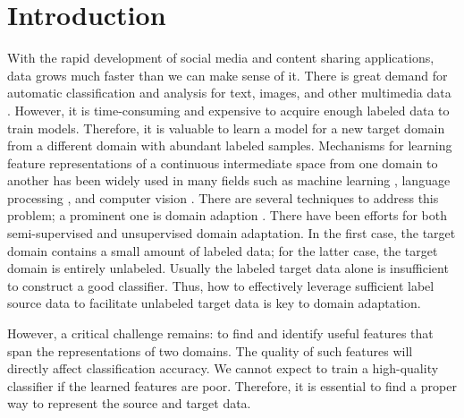\documentclass[10pt, conference, compsocconf]{IEEEtran}
\begin{document}
\IEEEpeerreviewmaketitle



\section{Introduction}
 With the rapid development of social media and content sharing applications, data grows much faster than we can make sense of it. There is  great demand for automatic classification and analysis for text, images, and other multimedia data \cite{chen2018zero}. However, it is time-consuming and expensive to acquire enough labeled data to train models.  Therefore, it is valuable to learn a model for a new target domain from a different domain with abundant labeled samples.  Mechanisms for learning feature representations of a continuous intermediate space from one domain to another has been widely used in many fields such as machine learning \cite{ben2007analysis}, language processing \cite{blitzer2007biographies}, and computer vision \cite{gopalan2011domain}. There are several techniques to address this problem; a prominent one is domain adaption \cite{gong2012geodesic,long2013transfer,tzeng2014deep}. There have been efforts for both semi-supervised \cite{pan2011domain,ben2010theory,bergamo2010exploiting} and unsupervised \cite{blitzer2008learning,mansour2009domain,ben2010impossibility} domain adaptation. In the first case, the target domain contains a small amount of labeled data; for the latter case, the target domain is entirely unlabeled. Usually the labeled target data alone is insufficient to construct a good classifier. Thus, how to effectively leverage sufficient label source data to facilitate unlabeled target data is key to domain adaptation.


However, a critical challenge remains: to find and identify useful features that span the representations of two domains. The quality of such features will directly affect classification accuracy. We cannot expect to train a high-quality classifier if the learned features are poor. Therefore, it is essential to find a proper way to represent the source and target data.
\end{document}

